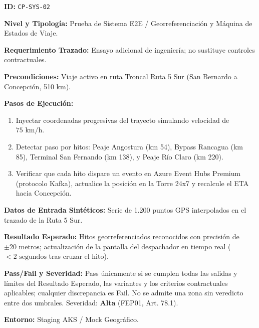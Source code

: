 \par\noindent\textbf{ID:} \texttt{C\allowbreak{}P\allowbreak{}-\allowbreak{}S\allowbreak{}Y\allowbreak{}S\allowbreak{}-\allowbreak{}0\allowbreak{}2\allowbreak{}}\par
\par\noindent\textbf{Nivel y Tipología:} Prueba de Sistema E2E / Georreferenciación y Máquina de Estados de Viaje.\par
\par\noindent\textbf{Requerimiento Trazado:} Ensayo adicional de ingeniería; no sustituye controles contractuales.\par
\par\noindent\textbf{Precondiciones:} Viaje activo en ruta Troncal Ruta 5 Sur (San Bernardo a Concepción, 510 km).\par
\par\noindent\textbf{Pasos de Ejecución:} \par
\begin{enumerate}
\item Inyectar coordenadas progresivas del trayecto simulando velocidad de \(75\text{ km/h}\).
\item Detectar paso por hitos: Peaje Angostura (km 54), Bypass Rancagua (km 85), Terminal San Fernando (km 138), y Peaje Río Claro (km 220).
\item Verificar que cada hito dispare un evento en Azure Event Hubs Premium (protocolo Kafka), actualice la posición en la Torre 24x7 y recalcule el ETA hacia Concepción.
\end{enumerate}
\par\noindent\textbf{Datos de Entrada Sintéticos:} Serie de 1.200 puntos GPS interpolados en el trazado de la Ruta 5 Sur.\par
\par\noindent\textbf{Resultado Esperado:} Hitos georreferenciados reconocidos con precisión de \(\pm 20\text{ metros}\); actualización de la pantalla del despachador en tiempo real (\(< 2\text{ segundos}\) tras cruzar el hito).\par
\par\noindent\textbf{Pass/Fail y Severidad:} Pass únicamente si se cumplen todas las salidas y límites del Resultado Esperado, las variantes y los criterios contractuales aplicables; cualquier discrepancia es Fail. No se admite una zona sin veredicto entre dos umbrales. Severidad: \textbf{Alta} (FEP01, Art. 78.1).\par
\par\noindent\textbf{Entorno:} Staging AKS / Mock Geográfico.\par






